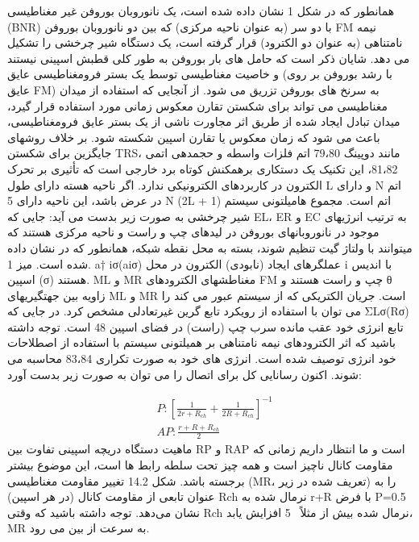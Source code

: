 همانطور که در شکل 1 نشان داده شده است، یک نانوروبان بوروفن غیر مغناطیسی (BNR) با دو سر (به عنوان ناحیه مرکزی) که بین دو نانوروبان بوروفن FM نیمه نامتناهی (به عنوان دو الکترود) قرار گرفته است، یک دستگاه شیر چرخشی را تشکیل می دهد. شایان ذکر است که حامل های بار بوروفن به طور کلی قطبش اسپینی نیستند و خاصیت مغناطیسی توسط یک بستر فرومغناطیسی عایق (با رشد بوروفن بر روی عایق FM) به سرنخ های بوروفن تزریق می شود. از آنجایی که استفاده از میدان مغناطیسی می تواند برای شکستن تقارن معکوس زمانی مورد استفاده قرار گیرد، میدان تبادل ایجاد شده از طریق اثر مجاورت ناشی از یک بستر عایق فرومغناطیسی، باعث می شود که زمان معکوس یا تقارن اسپین شکسته شود. بر خلاف روشهای جایگزین برای شکستن TRS، مانند دوپینگ 79،80 اتم فلزات واسطه و حجمدهی اتمی 81،82، این تکنیک یک دستکاری برهمکنش کوتاه برد خارجی است که تأثیری بر تحرک الکترون در کاربردهای الکترونیکی ندارد. اگر ناحیه هسته دارای طول L و دارای N اتم در عرض باشد، این ناحیه دارای 5 N (2L + 1) اتم است. مجموع هامیلتونی سیستم شیر چرخشی به صورت زیر بدست می آید:
جایی که EL، ER و EC به ترتیب انرژیهای موجود در نانوروبانهای بوروفن در لیدهای چپ و راست و ناحیه مرکزی هستند که میتوانند با ولتاژ گیت تنظیم شوند، بسته به محل نقطه شبکه، همانطور که در نشان داده شده است. میز 1. a† iσ(aiσ) عملگرهای ایجاد (نابودی) الکترون در محل i با اندیس اسپین (σ) هستند. ML و MR مغناطشهای الکترودهای FM چپ و راست هستند و θ زاویه بین جهتگیریهای ML و MR است. جریان الکتریکی که از سیستم عبور می کند را می توان با استفاده از رویکرد تابع گرین غیرتعادلی مشخص کرد.
در جایی که ΣLσ(Rσ) تابع انرژی خود عقب مانده سرب چپ (راست) در فضای اسپین 48 است. توجه داشته باشید که اثر الکترودهای نیمه نامتناهی بر همیلتونی سیستم با استفاده از اصطلاحات خود انرژی توصیف شده است. انرژی های خود به صورت تکراری 83،84 محاسبه می شوند. اکنون رسانایی کل برای اتصال را می توان به صورت زیر بدست آورد:

\begin{equation}
  \begin{aligned}
  & P:{{\left[ \frac{1}{2r+{{R}_{ch}}}+\frac{1}{2R+{{R}_{ch}}} \right]}^{-1}} \\ 
 & AP:\frac{r+R+{{R}_{ch}}}{2}  
  \end{aligned}
\end{equation}
ماهیت دستگاه دریچه اسپینی تفاوت بین RP و RAP است و ما انتظار داریم زمانی که مقاومت کانال ناچیز است و همه چیز تحت سلطه رابط ها است، این موضوع بیشتر برجسته باشد. شکل 14.2 تغییر مقاومت مغناطیسی (MR، تعریف شده در زیر) را به عنوان تابعی از مقاومت کانال (در هر اسپین) Rch نرمال شده به r+R با فرض P=0.5 نشان می‌دهد. توجه داشته باشید که وقتی Rch نرمال شده بیش از مثلاً ~5 افزایش یابد، MR به سرعت از بین می رود.


